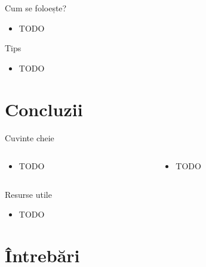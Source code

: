 \documentclass{beamer}
\begin{document}
\begin{frame}{Cum se foloește?}
  \begin{itemize}
    \item TODO
  \end{itemize}
\end{frame}

\begin{frame}{Tips}
  \begin{itemize}
    \item TODO
  \end{itemize}
\end{frame}

\section{Concluzii}

\begin{frame}{Cuvinte cheie}
  \begin{columns}
    \begin{column}[l]{0.5\textwidth}
      \begin{itemize}
        \item TODO
      \end{itemize}
    \end{column}
    \begin{column}[l]{0.5\textwidth}
      \begin{itemize}
        \item TODO
      \end{itemize}
    \end{column}
  \end{columns}
\end{frame}

\begin{frame}{Resurse utile}
  \begin{itemize}
    \small
    \item TODO
  \end{itemize}
\end{frame}

\section{Întrebări}
\end{document}
